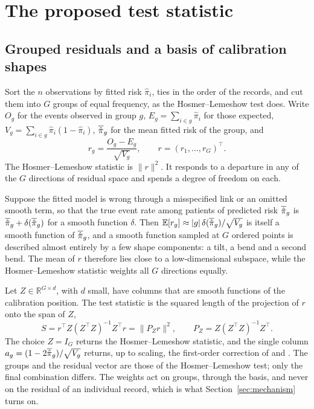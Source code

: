 \section{The proposed test statistic}\label{sec:test}

\subsection{Grouped residuals and a basis of calibration shapes}

Sort the $n$ observations by fitted risk $\hat\pi_i$, ties in the order of the records, and cut them
into $G$ groups of equal frequency, as the Hosmer--Lemeshow test does. Write $O_g$ for the events observed in group $g$,
$E_g=\sum_{i\in g}\hat\pi_i$ for those expected, $V_g=\sum_{i\in g}\hat\pi_i(1-\hat\pi_i)$, $\overline{\hat{\pi}}_g$
for the mean fitted risk of the group, and
\begin{equation}\label{eq:resid}
  r_g=\frac{O_g-E_g}{\sqrt{V_g}},\qquad r=(r_1,\dots,r_G)^\top .
\end{equation}
The Hosmer--Lemeshow statistic is $\lVert r\rVert^2$. It responds to a departure in any of the $G$
directions of residual space and spends a degree of freedom on each.

Suppose the fitted model is wrong through a misspecified link or an omitted smooth term, so that the
true event rate among patients of predicted risk $\overline{\hat{\pi}}_g$ is $\overline{\hat{\pi}}_g+\delta(\overline{\hat{\pi}}_g)$ for a smooth
function $\delta$. Then $\mathbb{E}[r_g]\approx|g|\,\delta(\overline{\hat{\pi}}_g)/\sqrt{V_g}$ is itself a smooth
function of $\overline{\hat{\pi}}_g$, and a smooth function sampled at $G$ ordered points is described almost
entirely by a few shape components: a tilt, a bend and a second bend. The mean of $r$ therefore lies
close to a low-dimensional subspace, while the Hosmer--Lemeshow statistic weights all $G$ directions
equally.

Let $Z\in\mathbb{R}^{G\times d}$, with $d$ small, have columns that are smooth functions of the
calibration position. The test statistic is the squared length of the projection of $r$ onto the
span of $Z$,
\begin{equation}\label{eq:stat}
  S=r^\top Z(Z^\top Z)^{-1}Z^\top r=\lVert P_Z r\rVert^2 ,
  \qquad P_Z=Z(Z^\top Z)^{-1}Z^\top .
\end{equation}
The choice $Z=I_G$ returns the Hosmer--Lemeshow statistic, and the single column
$a_g=(1-2\overline{\hat{\pi}}_g)/\sqrt{V_g}$ returns, up to scaling, the first-order correction of
\citet{osius1992normal} and \citet{farrington1996}. The groups and the residual vector are those of
the Hosmer--Lemeshow test; only the final combination differs. The weights act on groups, through the
basis, and never on the residual of an individual record, which is what Section~\ref{sec:mechanism}
turns on.

